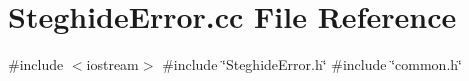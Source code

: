 \section{Steghide\+Error.\+cc File Reference}
\label{SteghideError_8cc}
{\ttfamily \#include $<$iostream$>$}\newline
{\ttfamily \#include \char`\"{}Steghide\+Error.\+h\char`\"{}}\newline
{\ttfamily \#include \char`\"{}common.\+h\char`\"{}}\newline
